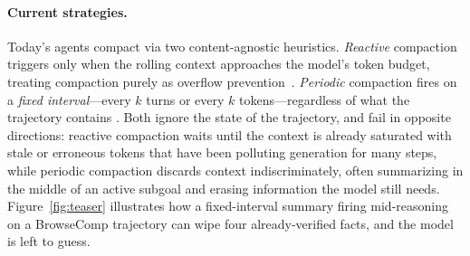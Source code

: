 \documentclass{article}
\newcommand{\jack}[1]{{\color{green}[JZ: #1]}}
\begin{document}
\paragraph{Current strategies.} Today's agents compact via two
content-agnostic heuristics. \emph{Reactive} compaction triggers only when
the rolling context approaches the model's token budget, treating
compaction purely as overflow prevention~\citep{anthropic2025claudecode}.
\emph{Periodic} compaction fires on a \emph{fixed interval}---every $k$
turns or every $k$ tokens---regardless of what the trajectory contains
\citep{research2026composer2technicalreport,
wu2026reasoningcachecontinualimprovement}. Both ignore the state of the
trajectory, and fail in opposite directions: reactive compaction waits
until the context is already saturated with stale or erroneous tokens that
have been polluting generation for many steps, while periodic compaction
discards context indiscriminately, often summarizing in the middle of an
active subgoal and erasing information the model still needs.
Figure~\ref{fig:teaser} illustrates how a fixed-interval
summary firing mid-reasoning on a BrowseComp trajectory can wipe four
already-verified facts, and the model is left to guess.

 



\end{document}
